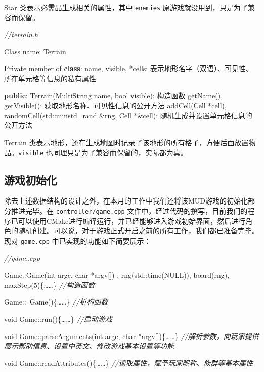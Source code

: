 \documentclass[hyperref,UTF8,a4paper]{ctexart}
\newenvironment{Shaded}{}{}
\newcommand{\BuiltInTok}[1]{#1}
\newcommand{\CommentTok}[1]{\textcolor[rgb]{0.38,0.63,0.69}{\textit{#1}}}
\newcommand{\DataTypeTok}[1]{\textcolor[rgb]{0.56,0.13,0.00}{#1}}
\newcommand{\DecValTok}[1]{\textcolor[rgb]{0.25,0.63,0.44}{#1}}
\newcommand{\KeywordTok}[1]{\textcolor[rgb]{0.00,0.44,0.13}{\textbf{#1}}}
\newcommand{\NormalTok}[1]{#1}
\begin{document}
Star 类表示必需品生成相关的属性，其中 \texttt{enemies}
原游戏就没用到，只是为了兼容而保留。

\begin{Shaded}
\begin{Highlighting}[]
\CommentTok{//terrain.h}

\NormalTok{Class name: Terrain}

\NormalTok{Private member of }\KeywordTok{class}\NormalTok{:}
\NormalTok{    name, visible, *cells: 表示地形名字（双语）、可见性、所在单元格等信息的私有属性}

\KeywordTok{public}\NormalTok{:}
\NormalTok{    Terrain(MultiString name, }\DataTypeTok{bool}\NormalTok{ visible): 构造函数}
\NormalTok{    getName(), getVisible(): 获取地形名称、可见性信息的公开方法}
\NormalTok{    addCell(Cell *cell), randomCell(}\BuiltInTok{std::}\NormalTok{minstd_rand &rng, Cell *&cell): 随机生成并设置单元格信息的公开方法}
\end{Highlighting}
\end{Shaded}

Terrain
类表示地形，还在生成地图时记录了该地形的所有格子，方便后面放置物品。\texttt{visible}
也同理只是为了兼容而保留的，实际都为真。

\hypertarget{ux6e38ux620fux521dux59cbux5316}{%
\subsection{游戏初始化}\label{ux6e38ux620fux521dux59cbux5316}}

除去上述数据结构的设计之外，在本月的工作中我们还将该MUD游戏的初始化部分推进完毕。在
\texttt{controller/game.cpp}
文件中，经过代码的撰写，目前我们的程序已可以使用CMake进行编译运行，并已经能够进入游戏初始界面，然后进行角色的随机创建。可以说，对于游戏正式开启之前的所有工作，我们都已准备完毕。现对
\texttt{game.cpp} 中已实现的功能如下简要展示：

\begin{Shaded}
\begin{Highlighting}[]
\CommentTok{//game.cpp}

\NormalTok{Game::Game(}\DataTypeTok{int}\NormalTok{ argc, }\DataTypeTok{char}\NormalTok{ *argv[]) : rng(}\BuiltInTok{std::}\NormalTok{time(NULL)), board(rng), maxStep(}\DecValTok{5}\NormalTok{)\{……\}}
\CommentTok{//构造函数}

\NormalTok{Game::~Game()\{……\}}
\CommentTok{//析构函数}

\DataTypeTok{void}\NormalTok{ Game::run()\{……\}}
\CommentTok{//启动游戏}

\DataTypeTok{void}\NormalTok{ Game::parseArguments(}\DataTypeTok{int}\NormalTok{ argc, }\DataTypeTok{char}\NormalTok{ *argv[])\{……\}}
\CommentTok{//解析参数，向玩家提供展示帮助信息、设置中英文、修改游戏基本设置等功能}

\DataTypeTok{void}\NormalTok{ Game::readAttributes()\{……\}}
\CommentTok{//读取属性，赋予玩家昵称、族群等基本属性}
\end{Highlighting}
\end{Shaded}
\end{document}
